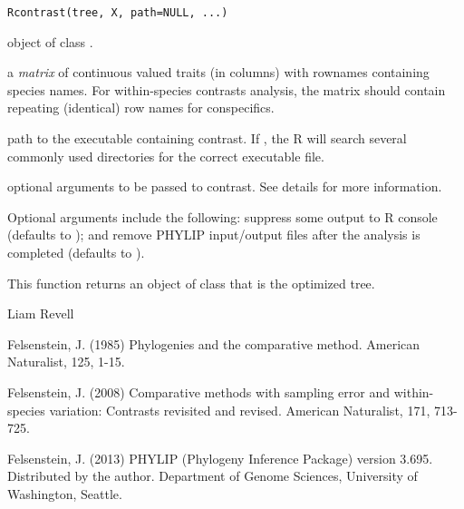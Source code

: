 \documentclass[a4paper]{book}
\begin{document}
%
\begin{Usage}
\begin{verbatim}
Rcontrast(tree, X, path=NULL, ...)
\end{verbatim}
\end{Usage}
%
\begin{Arguments}
\begin{ldescription}
\item[\code{tree}] object of class .
\item[\code{X}] a \emph{matrix} of continuous valued traits (in columns) with rownames containing species names. For within-species contrasts analysis, the matrix should contain repeating (identical) row names for conspecifics.
\item[\code{path}] path to the executable containing contrast. If , the R will search several commonly used directories for the correct executable file.
\item[\code{...}] optional arguments to be passed to contrast. See details for more information.
\end{ldescription}
\end{Arguments}
%
\begin{Details}\relax
Optional arguments include the following:  suppress some output to R console (defaults to ); and  remove PHYLIP input/output files after the analysis is completed (defaults to ).
\end{Details}
%
\begin{Value}
This function returns an object of class  that is the optimized tree.
\end{Value}
%
\begin{Author}\relax
Liam Revell 
\end{Author}
%
\begin{References}\relax
Felsenstein, J. (1985) Phylogenies and the comparative method. American Naturalist, 125, 1-15.

Felsenstein, J. (2008) Comparative methods with sampling error and within-species variation: Contrasts revisited and revised. American Naturalist, 171, 713-725.

Felsenstein, J. (2013) PHYLIP (Phylogeny Inference Package) version 3.695. Distributed by the author. Department of Genome Sciences, University of Washington, Seattle.
\end{References}
%
\begin{SeeAlso}\relax
{}
\end{SeeAlso}
\end{document}

